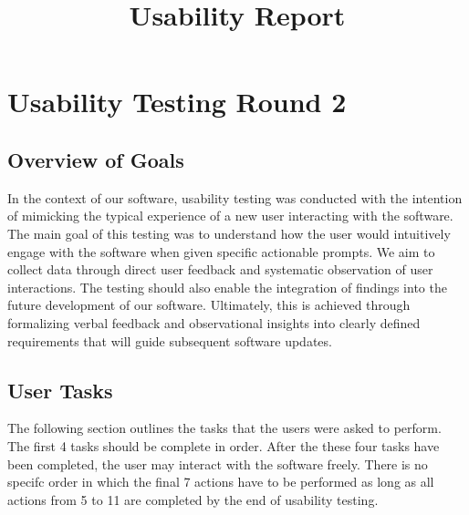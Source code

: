 \documentclass{article}
\title{Usability Report\\\progname}
\author{\authname}
\date{}
\begin{document}
\maketitle
\newpage

\section{Usability Testing Round 2}

\subsection{Overview of Goals}

In the context of our software, usability testing was conducted with the intention of mimicking the typical experience of a new user interacting with the software. The main goal of this testing was to understand how the user would intuitively engage with the software when given specific actionable prompts. We aim to collect data through direct user feedback and systematic observation of user interactions. The testing should also enable the integration of findings into the future development of our software. Ultimately, this is achieved through formalizing verbal feedback and observational insights into clearly defined requirements that will guide subsequent software updates.

\subsection{User Tasks}

The following section outlines the tasks that the users were asked to perform. The first 4 tasks should be complete in order. After the these four tasks have been completed, the user may interact with the software freely. There is no specifc order in which the final 7 actions have to be performed as long as all actions from 5 to 11 are completed by the end of usability testing. \\
\end{document}
